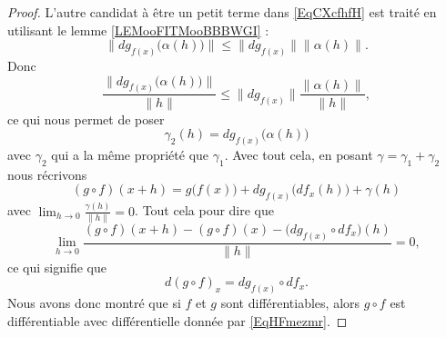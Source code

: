 \begin{proof}
    L'autre candidat à être un petit terme dans \eqref{EqCXcfhfH} est traité en utilisant le lemme \ref{LEMooFITMooBBBWGI} :
    \begin{equation}
        \| dg_{f(x)}\big( \alpha(h) \big) \|\leq \| dg_{f(x)} \|\| \alpha(h) \|.
    \end{equation}
    Donc
    \begin{equation}
        \frac{ \| dg_{f(x)}\big( \alpha(h) \big) \| }{ \| h \| }\leq \| dg_{f(x)} \|\frac{ \| \alpha(h) \| }{ \| h \| },
    \end{equation}
    ce qui nous permet de poser
    \begin{equation}
        \gamma_2(h)=dg_{f(x)}\big( \alpha(h) \big)
    \end{equation}
    avec \( \gamma_2\) qui a la même propriété que \( \gamma_1\). Avec tout cela, en posant \( \gamma=\gamma_1+\gamma_2\) nous récrivons
    \begin{equation}
        (g\circ f)(x+h)=g\big( f(x) \big)+dg_{f(x)}\big( df_x(h) \big)+\gamma(h)
    \end{equation}
    avec \( \lim_{h\to 0} \frac{ \gamma(h) }{ \| h \| }=0\). Tout cela pour dire que
    \begin{equation}
        \lim_{h\to 0} \frac{ (g\circ f)(x+h)-(g\circ f)(x)-\big( dg_{f(x)}\circ df_x \big)(h) }{ \| h \| }=0,
    \end{equation}
    ce qui signifie que 
    \begin{equation}
        d(g\circ f)_x=dg_{f(x)}\circ df_x.
    \end{equation}
    Nous avons donc montré que si \( f\) et \( g\) sont différentiables, alors \( g\circ f\) est différentiable avec différentielle donnée par \eqref{EqHFmezmr}.


\end{proof}
